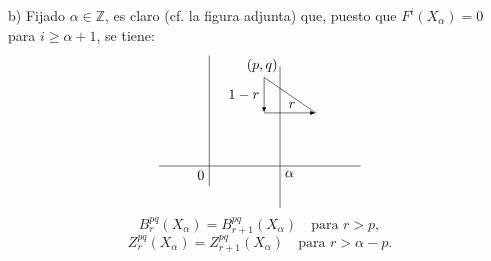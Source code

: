 b) Fijado \(\alpha\in\mathbb Z\), es claro (cf. la figura adjunta) que, puesto que \(F^i(X_\alpha)=0\) para \(i\ge\alpha+1\), se tiene:
\[
\begin{tikzpicture}[baseline=(current bounding box.center),x=1.0cm,y=1.0cm,>=latex]
\draw (-1.27,0) -- (3.81,0);
\draw (0,-0.5) -- (0,2.77);
\draw (1.78,-1.05) -- (1.78,2.5);
\node[below left] at (0,0) {$0$};
\node[below right] at (1.78,0) {$\alpha$};
\draw[->] (1.38,2.22) -- (1.38,1.33);
\draw[->] (1.38,1.33) -- (2.68,1.33);
\draw (1.38,2.22) -- (2.68,1.33);
\node[above] at (1.33,2.22) {$(p,q)$};
\node[left] at (1.38,1.78) {$1-r$};
\node[above] at (2.08,1.33) {$r$};
\end{tikzpicture}
\]
\[
B_r^{pq}(X_\alpha)=B_{r+1}^{pq}(X_\alpha)\quad\text{para }r>p,
\]
\[
Z_r^{pq}(X_\alpha)=Z_{r+1}^{pq}(X_\alpha)\quad\text{para }r>\alpha-p.
\]
